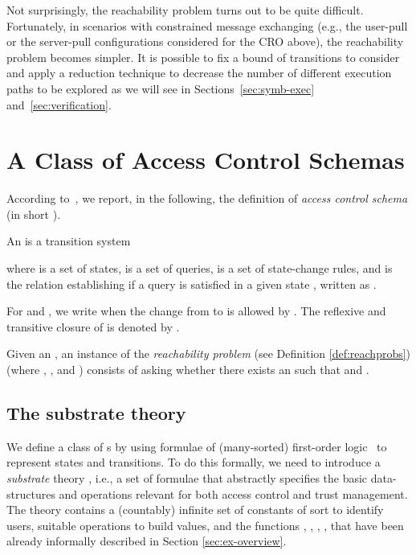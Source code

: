 \documentclass[conference]{llncs}
\newcommand{\CRO}{CRO}
\begin{document}
Not surprisingly, the reachability problem turns out to be quite
difficult.
Fortunately, in scenarios with constrained message exchanging (e.g., the user-pull or the
server-pull configurations considered for the \CRO{} above), the
reachability problem becomes simpler. It is possible to fix a bound 
of transitions to consider and apply a reduction technique to decrease 
the number of different execution paths to be explored as we will see in 
Sections~\ref{sec:symb-exec} and~\ref{sec:verification}.

\section{A Class of Access Control Schemas}
\label{sec:DKAL-light}

According to~\cite{lietal2005}, we report, in the following, the definition of \emph{access control schema} (in short ).

\begin{definition}
\label{acss}
An  is a transition system 
 
where  is a set of states,  is a set of queries,  is a set of state-change rules, and  is the relation establishing if a query
 is satisfied in a given state , written as
. 
\end{definition}

For  and , we write  when the change from  to  is allowed by
. The reflexive and transitive closure of 
is denoted by . 

Given an  , an instance  of the
\emph{reachability problem} (see Definition \ref{def:reachprobs}) (where , , and ) consists of asking whether there exists an  such that
 and .


\subsection{The substrate theory } 
\label{subsec:substh}
We define a class of
s by using formulae of (many-sorted) first-order
logic~\cite{enderton} to represent states and transitions. To do this
formally, we need to introduce a \emph{substrate} theory
, i.e., a set of formulae that abstractly specifies the
basic data-structures and operations relevant for both access control
and trust management. The theory contains a (countably) infinite set of
constants of sort  to identify users, suitable operations to
build  values, 
and the functions , , ,  , that have been already informally described in Section \ref{sec:ex-overview}.
\end{document}
